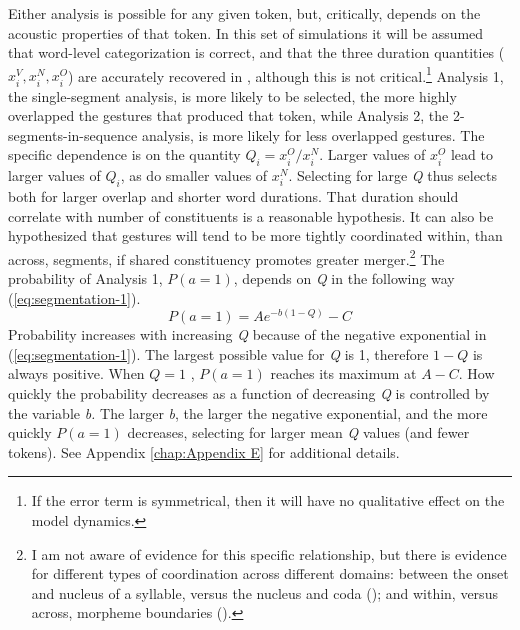 Either analysis is possible for any given token, but, critically,
depends on the acoustic properties of that token. In this set of simulations
it will be assumed that word-level categorization is correct, and
that the three duration quantities ($x_{i}^{V},x_{i}^{N},x_{i}^{O}$)
are accurately recovered in , although this is not critical.\footnote{If the error term is symmetrical, then it will have no qualitative
effect on the model dynamics.} Analysis 1, the single-segment analysis, is more likely to be selected,
the more highly overlapped the gestures that produced that token,
while Analysis 2, the 2-segments-in-sequence analysis, is more likely
for less overlapped gestures. The specific dependence is on the quantity
$Q_{i}={x_{i}^{O}}/{x_{i}^{N}}$. Larger values of $x_{i}^{O}$
lead to larger values of $Q_{i}$, as do smaller values of $x_{i}^{N}$.
Selecting for large \emph{Q} thus selects both for larger overlap
and shorter word durations. That duration should correlate with number
of constituents is a reasonable hypothesis. It can also be hypothesized
that  gestures will tend to be more tightly coordinated
within, than across, segments, if shared constituency promotes greater
merger.\footnote{I am not aware of evidence for this specific relationship, but there
is evidence for different types of  coordination across different
domains: between the onset and nucleus of a syllable, versus the nucleus
and coda (\citealt{Browman1988,byrd1996influences}); and within,
versus across, morpheme boundaries (\citealt{Cho2001}).} The probability of Analysis 1, $P(a=1)$, depends on \emph{Q} in
the following way (\ref{eq:segmentation-1}).
\begin{equation}
P(a=1)=Ae^{-b(1-Q)}-C\label{eq:segmentation-1}
\end{equation}
Probability increases with increasing \emph{Q} because of the negative
exponential in (\ref{eq:segmentation-1}). The largest possible value
for \emph{Q} is 1, therefore $1-Q$ is always positive. When $Q=1$
, $P(a=1)$ reaches its maximum at $A-C$. How quickly the probability
decreases as a function of decreasing \emph{Q} is controlled by the
variable \emph{b. }The larger \emph{b}, the larger the negative exponential,
and the more quickly $P(a=1)$ decreases, selecting for larger mean
\emph{Q} values (and fewer tokens). See Appendix \ref{chap:Appendix E}
for additional details.

